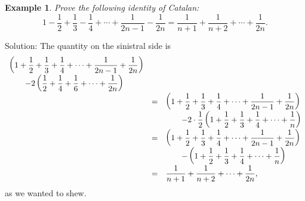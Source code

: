 \documentclass[11pt, openany]{book}
\theoremstyle{change} \theoremheaderfont{\blue\sffamily\bfseries}
\newtheorem{exa}[thm]{Example}
\theoremstyle{nonumberplain} \theoremheaderfont{\sffamily\bfseries}
\newcommand{\í}{\'{\i}}
\begin{document}
\begin{exa} Prove the following identity of Catalan:
$$ 1 - \frac{1}{2} + \frac{1}{3} - \frac{1}{4} + \cdots + \frac{1}{2n - 1} - \frac{1}{2n}
= \frac{1}{n + 1} + \frac{1}{n + 2} + \cdots + \frac{1}{2n}.$$
\end{exa}
Solution: The quantity on the sinistral side is
$${\everymath{\displaystyle}\begin{array}{lcl}
\left( 1 + \frac{1}{2} + \frac{1}{3} + \frac{1}{4} + \cdots + \frac{1}{2n - 1} + \frac{1}{2n}\right) & & \\
\qquad - 2\left(\frac{1}{2} + \frac{1}{4} + \frac{1}{6} + \cdots + \frac{1}{2n}\right) & & \\
& = &
\left( 1 + \frac{1}{2} + \frac{1}{3} + \frac{1}{4} + \cdots + \frac{1}{2n - 1} + \frac{1}{2n}\right)  \\
& & \qquad - 2\cdot\frac{1}{2}\left(1 + \frac{1}{2} + \frac{1}{3} +  \frac{1}{4} + \cdots + \frac{1}{n}\right)       \\
& = &
\left( 1 + \frac{1}{2} + \frac{1}{3} + \frac{1}{4} + \cdots + \frac{1}{2n - 1} + \frac{1}{2n}\right)  \\
& & \qquad - \left(1 + \frac{1}{2} + \frac{1}{3} +  \frac{1}{4} + \cdots + \frac{1}{n}\right)      \\
& = & \frac{1}{n + 1} + \frac{1}{n + 2} + \cdots + \frac{1}{2n},
\end{array}}$$
as we wanted to shew.
\end{document}
